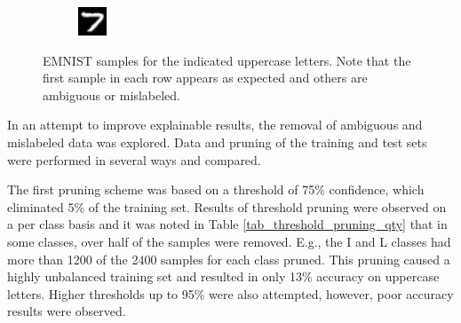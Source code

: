 \documentclass[conference]{IEEEtran}
\begin{document}
\begin{figure}[h]
\begin{subfigure}{.10\textwidth}
        \label{fig:issue_T03}
    \end{subfigure}%
    \begin{subfigure}{.10\textwidth}
        \centering
        \includegraphics[width=.90\textwidth]{./images/issues/T-04.png}
        \label{fig:issue_T04}
    \end{subfigure}
    \caption{EMNIST samples for the indicated uppercase letters.  Note that the first sample in each row appears as expected and others are ambiguous or mislabeled.}
    \label{fig:emnist_samples}
\end{figure}

In an attempt to improve explainable results, the removal of ambiguous and
mislabeled data was explored. Data and pruning of the training and test sets
were performed in several ways and compared.

The first pruning scheme was based on a threshold of 75\% confidence, which
eliminated 5\% of the training set. Results of threshold pruning were observed
on a per class basis and it was noted in Table \ref{tab_threshold_pruning_qty}
that in some classes, over half of the samples were removed.  E.g., the I and L
classes had more than 1200 of the 2400 samples for each class pruned. This
pruning caused a highly unbalanced training set and resulted in only 13\%
accuracy on uppercase letters.  Higher thresholds up to 95\% were also
attempted, however, poor accuracy results were observed.
\end{document}
